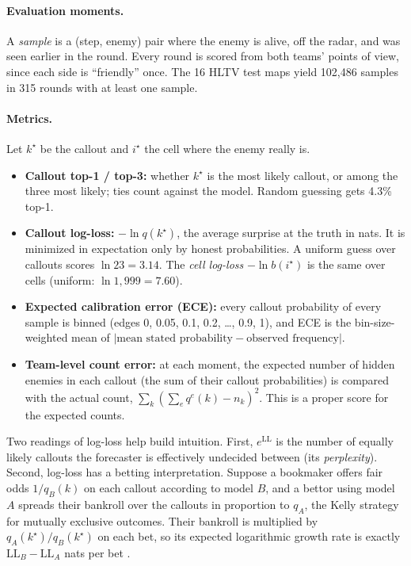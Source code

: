 \documentclass[11pt]{article}
\newcommand{\LL}{\mathrm{LL}}
\newcommand{\1}{\mathbb{1}}
\begin{document}
\paragraph{Evaluation moments.} A \emph{sample} is a (step, enemy) pair where the enemy is alive, off the radar, and was seen earlier in the round. Every round is scored from both teams' points of view, since each side is ``friendly'' once. The 16 HLTV test maps yield 102{,}486 samples in 315 rounds with at least one sample.

\paragraph{Metrics.} Let $k^\star$ be the callout and $i^\star$ the cell where the enemy really is.
\begin{itemize}
  \item \textbf{Callout top-1 / top-3:} whether $k^\star$ is the most likely callout, or among the three most likely; ties count against the model. Random guessing gets 4.3\% top-1.
  \item \textbf{Callout log-loss:} $-\ln q(k^\star)$, the average surprise at the truth in nats. It is minimized in expectation only by honest probabilities. A uniform guess over callouts scores $\ln 23 = 3.14$. The \emph{cell log-loss} $-\ln b(i^\star)$ is the same over cells (uniform: $\ln 1{,}999 = 7.60$).
  \item \textbf{Expected calibration error (ECE):} every callout probability of every sample is binned (edges 0, 0.05, 0.1, 0.2, \dots, 0.9, 1), and ECE is the bin-size-weighted mean of $|\text{mean stated probability} - \text{observed frequency}|$.
  \item \textbf{Team-level count error:} at each moment, the expected number of hidden enemies in each callout (the sum of their callout probabilities) is compared with the actual count, $\sum_k (\sum_e q^e(k) - n_k)^2$. This is a proper score for the expected counts.
\end{itemize}
Two readings of log-loss help build intuition. First, $e^{\LL}$ is the number of equally likely callouts the forecaster is effectively undecided between (its \emph{perplexity}). Second, log-loss has a betting interpretation. Suppose a bookmaker offers fair odds $1/q_B(k)$ on each callout according to model $B$, and a bettor using model $A$ spreads their bankroll over the callouts in proportion to $q_A$, the Kelly strategy for mutually exclusive outcomes. Their bankroll is multiplied by $q_A(k^\star)/q_B(k^\star)$ on each bet, so its expected logarithmic growth rate is exactly $\LL_B - \LL_A$ nats per bet \citep{kelly1956new,cover2006elements}.
\end{document}
